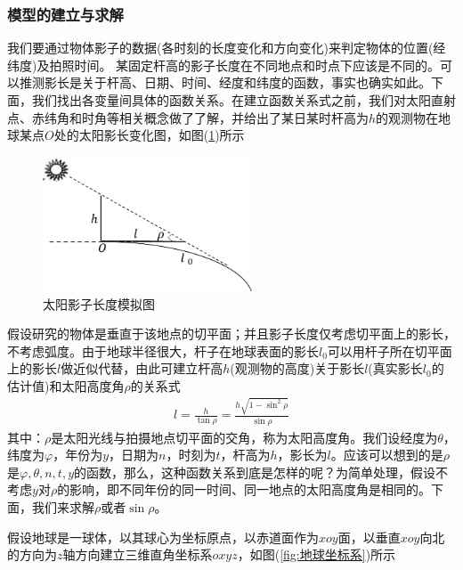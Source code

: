         \subsubsection{模型的建立与求解}
            \par
            我们要通过物体影子的数据(各时刻的长度变化和方向变化)来判定物体的位置(经纬度)及拍照时间。
            某固定杆高的影子长度在不同地点和时点下应该是不同的。可以推测影长是关于杆高、日期、时间、经度和纬度的函数，事实也确实如此。下面，我们找出各变量间具体的函数关系。在建立函数关系式之前，我们对太阳直射点、赤纬角和时角等相关概念做了了解，并给出了某日某时杆高为$h$的观测物在地球某点$O$处的太阳影长变化图，如图(\ref{fig:太阳影子长度模拟图})所示
			\begin{figure}[H]
			\centering
			\includegraphics[height=4cm]{images/Sun_shadow_length_simulation.jpg}
			\caption{太阳影子长度模拟图}
			\label{fig:太阳影子长度模拟图}
			\end{figure}
            \par
            假设研究的物体是垂直于该地点的切平面；并且影子长度仅考虑切平面上的影长，不考虑弧度。由于地球半径很大，杆子在地球表面的影长$l_0$可以用杆子所在切平面上的影长$l$做近似代替，由此可建立杆高$h$(观测物的高度)关于影长$l$(真实影长$l_0$的估计值)和太阳高度角$\rho$的关系式
            \begin{align*}
            l = \frac{h}{\tan\rho} = \frac{h\sqrt{1-\sin^2\rho}}{\sin\rho}
            \end{align*}
            其中：$\rho$是太阳光线与拍摄地点切平面的交角，称为太阳高度角。我们设经度为$\theta$，纬度为$\varphi$，年份为$y$，日期为$n$，时刻为$t$，杆高为$h$，影长为$l$。应该可以想到的是$\rho$是$\varphi,\theta,n,t,y$的函数，那么，这种函数关系到底是怎样的呢？为简单处理，假设不考虑$y$对$\rho$的影响，即不同年份的同一时间、同一地点的太阳高度角是相同的。下面，我们来求解$\rho$或者$\sin\rho$。
            \par
            假设地球是一球体，以其球心为坐标原点，以赤道面作为$xoy$面，以垂直$xoy$向北的方向为$z$轴方向建立三维直角坐标系$oxyz$，如图(\ref{fig:地球坐标系})所示
